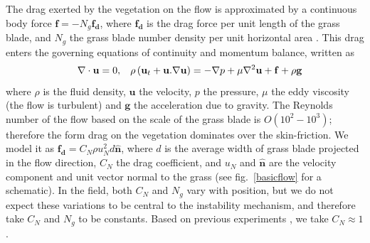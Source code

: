 \documentclass[aps,prl,twocolumn,superscriptaddress,10pt]{revtex4-1}  %
\newcommand{\bn}{{\boldsymbol{\hat{n}}}}
\newcommand{\bu}{\mathbf{u}}
\newcommand{\grad}{\mathbf{\nabla}}
\begin{document}
The drag exerted by the vegetation on the flow is approximated by a continuous body force $\mathbf{f}=-N_g\mathbf{f_d}$,  where $\mathbf{f_{d}}$ is the drag force per unit length of the grass blade, and $N_g$ the grass blade number density per unit horizontal area \cite{Vivoni98,Nepf99,Ghisal02,Delangre04,Delangre06}. 
This drag enters the governing equations of continuity and momentum balance, written as 
\begin{equation}
\quad \grad\cdot\bu = 0,\hspace{3mm} \rho \left(\bu_{t}+\bu.\grad\bu \right) = -\grad p+\mu\grad^{2}\bu +\mathbf{f}+\rho\mathbf{g}
\label{navier-stokes}
\end{equation}
where $\rho$ is the fluid density, $\mathbf{u}$ the velocity, 
$p$ the pressure, $\mu$ the eddy viscosity (the flow is turbulent) and $\mathbf{g}$ the acceleration due to gravity. 
The Reynolds number of the flow based on the scale of the grass blade is $O(10^2-10^3)$; therefore the form drag on the vegetation dominates over the skin-friction. 
We model it as 
$\mathbf{f_{d}}=C_N \rho u_{N}^{2}d\bn$, 
where $d$ is the average width of grass blade projected in the flow direction, $C_{N}$ the drag coefficient, and $u_{N}$ and $\bn$ are the velocity component and unit vector normal to the grass (see fig.~\ref{basicflow} for a schematic). 
In the field, both $C_N$ and $N_g$ vary with position, but we do not expect these variations to be central to the instability mechanism, and therefore take $C_N$ and $N_g$ to be constants. 
Based on previous experiments \cite{Vivoni98}, we take $C_N \approx 1$.
\newline
\end{document}
